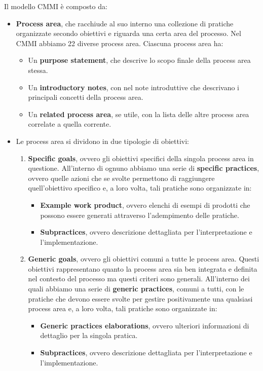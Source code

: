 Il modello CMMI è composto da:
\begin{itemize}
    \item \textbf{Process area}, che racchiude al suo interno una collezione di pratiche organizzate secondo obiettivi e riguarda una certa area del processo. Nel CMMI abbiamo 22 diverse process area. Ciascuna process area ha:
    \begin{itemize}
        \item Un \textbf{purpose statement}, che descrive lo scopo finale della process area stessa.
        \item Un \textbf{introductory notes}, con nel note introduttive che descrivano i principali concetti della process area.
        \item Un \textbf{related process area}, se utile, con la lista delle altre process area correlate a quella corrente.
    \end{itemize}
    \item Le process area si dividono in due tipologie di obiettivi:
    \begin{enumerate}
        \item \textbf{Specific goals}, ovvero gli obiettivi specifici della singola process area in questione. All'interno di ognuno abbiamo una serie di \textbf{specific practices}, ovvero quelle azioni che se svolte permettono di raggiungere quell'obiettivo specifico e, a loro volta, tali pratiche sono organizzate in:
        \begin{itemize}
            \item \textbf{Example work product}, ovvero elenchi di esempi di prodotti che possono essere generati attraverso l'adempimento delle pratiche.
            \item \textbf{Subpractices}, ovvero descrizione dettagliata per l'interpretazione e l'implementazione.
        \end{itemize}
        \item \textbf{Generic goals}, ovvero gli obiettivi comuni a tutte le process area. Questi obiettivi rappresentano quanto la process area sia ben integrata e definita nel contesto del processo ma questi criteri sono generali. All'interno dei quali abbiamo una serie di \textbf{generic practices}, comuni a tutti, con le pratiche che devono essere svolte per gestire positivamente una qualsiasi process area e, a loro volta, tali pratiche sono organizzate in:
        \begin{itemize}
            \item \textbf{Generic practices elaborations}, ovvero ulteriori informazioni di dettaglio per la singola pratica.
            \item \textbf{Subpractices}, ovvero descrizione dettagliata per l'interpretazione e l'implementazione.
        \end{itemize}
        

\end{enumerate}
\end{itemize}

